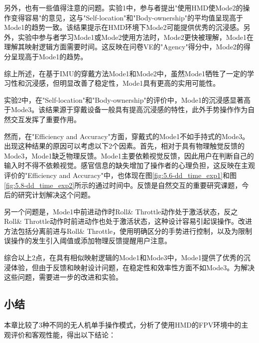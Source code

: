 另外，也有一些值得注意的问题。实验1中，参与者提出"使用HMD使Mode2的操作变得容易"的意见，这与"Self-location"和"Body-ownership"的平均值呈现高于Mode1的趋势一致。该结果提示在HMD环境下Mode2可能提供优秀的沉浸感。另外，实验中参与者学习Mode1或Mode2使用方法时，Mode2更快被理解，Mode1在理解其映射逻辑方面需要时间。这反映在问卷VE的"Agency"得分中，Mode2的得分呈现高于Mode1的趋势。

综上所述，在基于IMU的穿戴方法Mode1和Mode2中，虽然Mode1牺牲了一定的学习性和沉浸感，但明显改善了稳定性，Mode1具有更高的实用可能性。

实验2中，在"Self-location"和"Body-ownership"的评价中，Mode1的沉浸感显著高于Mode3。该结果源于穿戴设备一般具有提高沉浸感的特性，此外手势操作作为自然交互发挥了重要作用。

然而，在"Efficiency and Accuracy"方面，穿戴式的Mode1不如手持式的Mode3。出现这种结果的原因可以考虑以下2个因素。首先，相对于具有物理触觉反馈的Mode3，Mode1缺乏物理反馈。Mode1主要依赖视觉反馈，因此用户在判断自己的输入时不得不依赖视觉。感官信息的缺失增加了操作者的心理负担，这反映在主观评价的"Efficiency and Accuracy"中，也体现在图\ref{fig:5.6-dd_time_exp1}和图\ref{fig:5.8-dd_time_exp2}所示的通过时间中。反馈是自然交互的重要研究课题，今后的研究计划解决这个问题。

另一个问题是，Mode1中前进动作时Roll\& Throttle动作处于激活状态，反之Roll\& Throttle动作时前进动作也处于激活状态，这种设计容易引起误操作。改进方法包括分离前进与Roll\& Throttle，使用明确区分的手势进行控制，以及为限制误操作的发生引入阈值或添加物理反馈提醒用户注意。

综合以上2点，在具有相似映射逻辑的Mode1和Mode3中，Mode1提供了优秀的沉浸体验，但由于反馈和映射设计问题，在稳定性和效率性方面不如Mode3。为解决这些问题，需要进一步的改进和实验。

\subsection{小结}

本章比较了3种不同的无人机单手操作模式，分析了使用HMD的FPV环境中的主观评价和客观性能，得出以下结论：

